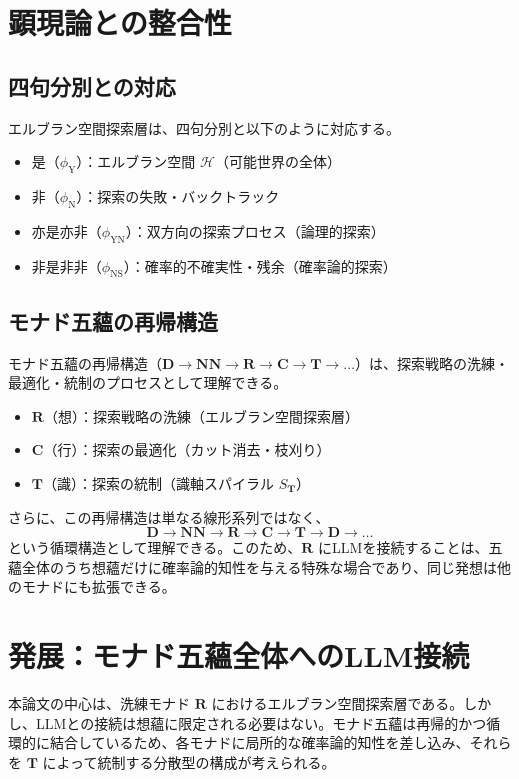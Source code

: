 \documentclass[11pt,a4paper]{ltjsarticle}
\theoremstyle{definition}
\newcommand{\Md}{\mathbf{D}}
\newcommand{\Mnn}{\mathbf{NN}}
\newcommand{\Mr}{\mathbf{R}}
\newcommand{\MC}{\mathbf{C}}
\newcommand{\MT}{\mathbf{T}}
\newcommand{\phiY}{\phi_{\text{Y}}}
\newcommand{\phiN}{\phi_{\text{N}}}
\newcommand{\phiYN}{\phi_{\text{YN}}}
\newcommand{\phiNS}{\phi_{\text{NS}}}
\newcommand{\Herbrand}{\mathcal{H}}
\begin{document}
\section{顕現論との整合性}

\subsection{四句分別との対応}

エルブラン空間探索層は、四句分別と以下のように対応する\cite{icat}。

\begin{itemize}
\item 是（$\phiY$）：エルブラン空間 $\Herbrand$（可能世界の全体）
\item 非（$\phiN$）：探索の失敗・バックトラック
\item 亦是亦非（$\phiYN$）：双方向の探索プロセス（論理的探索）
\item 非是非非（$\phiNS$）：確率的不確実性・残余（確率論的探索）
\end{itemize}

\subsection{モナド五蘊の再帰構造}

モナド五蘊の再帰構造（$\Md \to \Mnn \to \Mr \to \MC \to \MT \to \dots$）は、探索戦略の洗練・最適化・統制のプロセスとして理解できる。

\begin{itemize}
\item $\Mr$（想）：探索戦略の洗練（エルブラン空間探索層）
\item $\MC$（行）：探索の最適化（カット消去・枝刈り）
\item $\MT$（識）：探索の統制（識軸スパイラル $S_{\MT}$）
\end{itemize}

さらに、この再帰構造は単なる線形系列ではなく、
\[
\Md \to \Mnn \to \Mr \to \MC \to \MT \to \Md \to \dots
\]
という循環構造として理解できる。このため、$\Mr$ にLLMを接続することは、五蘊全体のうち想蘊だけに確率論的知性を与える特殊な場合であり、同じ発想は他のモナドにも拡張できる。

\section{発展：モナド五蘊全体へのLLM接続}

本論文の中心は、洗練モナド $\Mr$ におけるエルブラン空間探索層である。しかし、LLMとの接続は想蘊に限定される必要はない。モナド五蘊は再帰的かつ循環的に結合しているため、各モナドに局所的な確率論的知性を差し込み、それらを $\MT$ によって統制する分散型の構成が考えられる。
\end{document}
